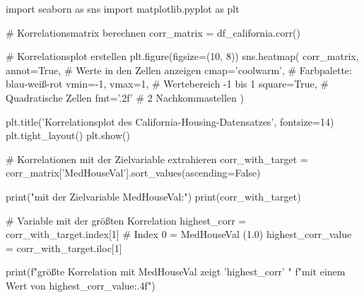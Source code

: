 import seaborn as sns
import matplotlib.pyplot as plt

# Korrelationsmatrix berechnen
corr_matrix = df_california.corr()

# Korrelationsplot erstellen
plt.figure(figsize=(10, 8))
sns.heatmap(
    corr_matrix,
    annot=True,           # Werte in den Zellen anzeigen
    cmap='coolwarm',      # Farbpalette: blau-weiß-rot
    vmin=-1, vmax=1,      # Wertebereich -1 bis 1
    square=True,          # Quadratische Zellen
    fmt='.2f'             # 2 Nachkommastellen
)

plt.title('Korrelationsplot des California-Housing-Datensatzes', fontsize=14)
plt.tight_layout()
plt.show()

# Korrelationen mit der Zielvariable extrahieren
corr_with_target = corr_matrix['MedHouseVal'].sort_values(ascending=False)

print("\nKorrelationen mit der Zielvariable MedHouseVal:")
print(corr_with_target)

# Variable mit der größten Korrelation
highest_corr = corr_with_target.index[1]  # Index 0 = MedHouseVal (1.0)
highest_corr_value = corr_with_target.iloc[1]

print(f"\nDie größte Korrelation mit MedHouseVal zeigt '{highest_corr}' "
      f"mit einem Wert von {highest_corr_value:.4f}")